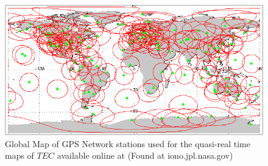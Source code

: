\begin{figure}[htb]
\begin{center}
\includegraphics[width=0.95\linewidth]{Ionosphere/figures/gps_sitemap.png}
\caption{Global Map of GPS Network stations used for the quasi-real time maps of $TEC$ available online at (Found at iono.jpl.nasa.gov)}
\label{Fig:gps_stat}
\end{center}
\end{figure}

